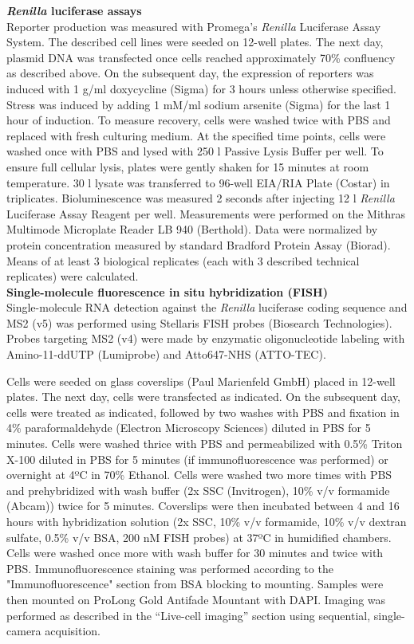 \textbf{\textit{Renilla} luciferase assays} \\
Reporter production was measured with Promega’s \textit{Renilla} Luciferase Assay System.
The described cell lines were seeded on 12-well plates.
The next day, plasmid DNA was transfected once cells reached approximately 70\% confluency as described above.
On the subsequent day, the expression of reporters was induced with 1 \textmu g/ml
    doxycycline (Sigma) for 3 hours unless otherwise specified.
Stress was induced by adding 1 mM/ml sodium arsenite (Sigma) for the last 1 hour of induction.
To measure recovery, cells were washed twice with PBS and replaced with fresh culturing medium.
At the specified time points, cells were washed once with PBS and lysed with 250 \textmu l Passive Lysis Buffer per well.
To ensure full cellular lysis, plates were gently shaken for 15 minutes at room temperature.
30 \textmu l lysate was transferred to 96-well EIA/RIA Plate (Costar) in triplicates.
Bioluminescence was measured 2 seconds after injecting 12 \textmu l \textit{Renilla} Luciferase Assay Reagent per well.
Measurements were performed on the Mithras Multimode Microplate Reader LB 940 (Berthold).
Data were normalized by protein concentration measured by standard Bradford Protein Assay (Biorad).
Means of at least 3 biological replicates (each with 3 described technical replicates) were calculated.
\\

\textbf{Single-molecule fluorescence in situ hybridization (FISH)} \\
Single-molecule RNA detection against the \textit{Renilla} luciferase coding sequence and MS2 (v5) was performed using Stellaris FISH probes (Biosearch Technologies).
Probes targeting MS2 (v4) were made by enzymatic oligonucleotide labeling \cite{gaspar_rna_2018} with Amino-11-ddUTP (Lumiprobe) and Atto647-NHS (ATTO-TEC). 

Cells were seeded on glass coverslips (Paul Marienfeld GmbH) placed in 12-well plates.
The next day, cells were transfected as indicated.
On the subsequent day, cells were treated as indicated, followed by two washes with PBS and fixation in 4\% paraformaldehyde (Electron Microscopy Sciences) diluted in PBS for 5 minutes.
Cells were washed thrice with PBS and permeabilized with 0.5\% Triton X-100 diluted in PBS for 5 minutes (if immunofluorescence was performed) or overnight at 4ºC in 70\% Ethanol.
Cells were washed two more times with PBS and prehybridized with wash buffer (2x SSC (Invitrogen), 10\% v/v formamide (Abcam)) twice for 5 minutes.
Coverslips were then incubated between 4 and 16 hours with hybridization solution (2x SSC, 10\% v/v formamide, 10\% v/v dextran sulfate, 0.5\% v/v BSA, 200 nM FISH probes) at 37ºC in humidified chambers.
Cells were washed once more with wash buffer for 30 minutes and twice with PBS.
Immunofluorescence staining was performed according to the "Immunofluorescence" section from BSA blocking to mounting.
Samples were then mounted on ProLong Gold Antifade Mountant with DAPI.
Imaging was performed as described in the “Live-cell imaging” section using sequential, single-camera acquisition.
\\

